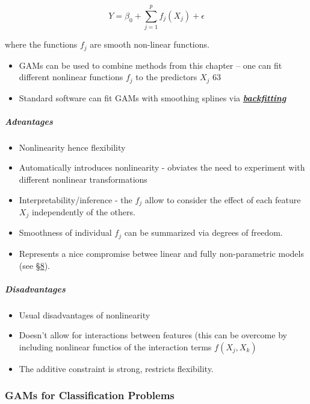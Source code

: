 \documentclass[11pt]{article}
\providecommand{\tightlist}{%
      \setlength{\itemsep}{0pt}\setlength{\parskip}{0pt}}
\begin{document}
\[Y =\beta_0 + \sum_{j=1}^p f_j(X_j) + \epsilon\]

where the functions \(f_j\) are smooth non-linear functions.

\begin{itemize}
\tightlist
\item
  GAMs can be used to combine methods from this chapter -- one can fit
  different nonlinear functions \(f_j\) to the predictors \(X_j\) 63
\item
  Standard software can fit GAMs with smoothing splines via
  \href{https://en.wikipedia.org/wiki/Backfitting_algorithm}{\textbf{\emph{backfitting}}}
\end{itemize}

    \hypertarget{advantages}{%
\subparagraph{Advantages}\label{advantages}}

    \begin{itemize}
\tightlist
\item
  Nonlinearity hence flexibility
\item
  Automatically introduces nonlinearity - obviates the need to
  experiment with different nonlinear transformations
\item
  Interpretability/inference - the \(f_j\) allow to consider the effect
  of each feature \(X_j\) independently of the others.
\item
  Smoothness of individual \(f_j\) can be summarized via degrees of
  freedom.
\item
  Represents a nice compromise betwee linear and fully non-parametric
  models (see \href{}{§8}).
\end{itemize}

    \hypertarget{disadvantages}{%
\subparagraph{Disadvantages}\label{disadvantages}}

    \begin{itemize}
\tightlist
\item
  Usual disadvantages of nonlinearity
\item
  Doesn't allow for interactions between features (this can be overcome
  by including nonlinear functios of the interaction terms
  \(f(X_j,X_k)\)
\item
  The additive constraint is strong, restricts flexibility.
\end{itemize}

    \hypertarget{gams-for-classification-problems}{%
\subsubsection{GAMs for Classification
Problems}\label{gams-for-classification-problems}}
\end{document}
